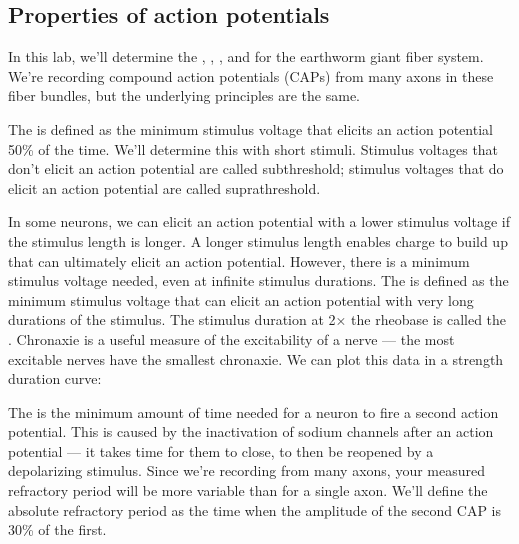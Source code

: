 \documentclass[letterpaper,10pt,english]{jupyterBook}
\begin{document}
\sphinxAtStartPar



\subsection{Properties of action potentials}
\label{\detokenize{Earthworm:properties-of-action-potentials}}
\sphinxAtStartPar
In this lab, we’ll determine the , , , and  for the earthworm giant fiber system. We’re recording compound action potentials (CAPs) from many axons in these fiber bundles, but the underlying principles are the same.

\sphinxAtStartPar
The  is defined as the minimum stimulus voltage that elicits an action potential 50\% of the time. We’ll determine this with short stimuli. Stimulus voltages that don’t elicit an action potential are called subthreshold; stimulus voltages that do elicit an action potential are called suprathreshold.

\sphinxAtStartPar
In some neurons, we can elicit an action potential with a lower stimulus voltage if the stimulus length is longer. A longer stimulus length enables charge to build up that can ultimately elicit an action potential. However, there is a minimum stimulus voltage needed, even at infinite stimulus durations. The  is defined as the minimum stimulus voltage that can elicit an action potential with very long durations of the stimulus. The stimulus duration at 2× the rheobase is called the . Chronaxie is a useful measure of the excitability of a nerve — the most excitable nerves have the smallest chronaxie. We can plot this data in a strength duration curve:

\sphinxAtStartPar
{}

\sphinxAtStartPar
The  is the minimum amount of time needed for a neuron to fire a second action potential. This is caused by the inactivation of sodium channels after an action potential — it takes time for them to close, to then be reopened by a depolarizing stimulus. Since we’re recording from many axons, your measured refractory period will be more variable than for a single axon. We’ll define the absolute refractory period as the time when the amplitude of the second CAP is 30\% of the first.
\end{document}
